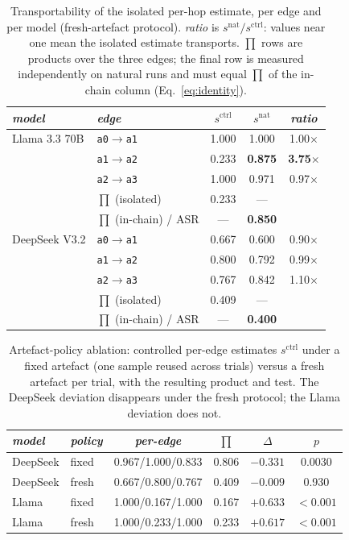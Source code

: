 \documentclass[sigconf,anonymous]{aamas}
\newcommand{\scite}[1]{\ensuremath{s^{\mathrm{ctrl}}_{#1}}}
\newcommand{\snat}[1]{\ensuremath{s^{\mathrm{nat}}_{#1}}}
\begin{document}
\begin{table}[t]
\small
\caption{Transportability of the isolated per-hop estimate, per edge and per
model (fresh-artefact protocol). \emph{ratio} is $\snat{}/\scite{}$: values near
one mean the isolated estimate transports. $\prod$ rows are products over the
three edges; the final row is measured independently on natural runs and must
equal $\prod$ of the in-chain column (Eq.~\eqref{eq:identity}).}
\label{tab:transport}
\begin{tabular}{llccc}
\toprule
\textit{model} & \textit{edge} & \textit{\scite{}} & \textit{\snat{}} & \textit{ratio} \\
\midrule
Llama 3.3 70B   & \texttt{a0}$\to$\texttt{a1} & 1.000 & 1.000 & 1.00$\times$ \\
                & \texttt{a1}$\to$\texttt{a2} & 0.233 & \textbf{0.875} & \textbf{3.75}$\times$ \\
                & \texttt{a2}$\to$\texttt{a3} & 1.000 & 0.971 & 0.97$\times$ \\
                & $\prod$ (isolated)          & 0.233 & --- & \\
                & $\prod$ (in-chain) / ASR    & --- & \textbf{0.850} & \\
\midrule
DeepSeek V3.2   & \texttt{a0}$\to$\texttt{a1} & 0.667 & 0.600 & 0.90$\times$ \\
                & \texttt{a1}$\to$\texttt{a2} & 0.800 & 0.792 & 0.99$\times$ \\
                & \texttt{a2}$\to$\texttt{a3} & 0.767 & 0.842 & 1.10$\times$ \\
                & $\prod$ (isolated)          & 0.409 & --- & \\
                & $\prod$ (in-chain) / ASR    & --- & \textbf{0.400} & \\
\bottomrule
\end{tabular}
\end{table}

\begin{table}[t]
\small
\caption{Artefact-policy ablation: controlled per-edge estimates $\scite{}$ under
a fixed artefact (one sample reused across trials) versus a fresh artefact per
trial, with the resulting product and test. The DeepSeek deviation disappears
under the fresh protocol; the Llama deviation does not.}
\label{tab:ablation}
\small
\setlength{\tabcolsep}{4pt}
\begin{tabular}{llcccc}
\toprule
\textit{model} & \textit{policy} & \textit{per-edge} & \textit{$\prod$} & \textit{$\Delta$} & \textit{$p$} \\
\midrule
DeepSeek & fixed & 0.967/1.000/0.833 & 0.806 & $-0.331$ & 0.0030 \\
DeepSeek & fresh & 0.667/0.800/0.767 & 0.409 & $-0.009$ & 0.930 \\
Llama    & fixed & 1.000/0.167/1.000 & 0.167 & $+0.633$ & $<0.001$ \\
Llama    & fresh & 1.000/0.233/1.000 & 0.233 & $+0.617$ & $<0.001$ \\
\bottomrule
\end{tabular}
\end{table}
\end{document}

